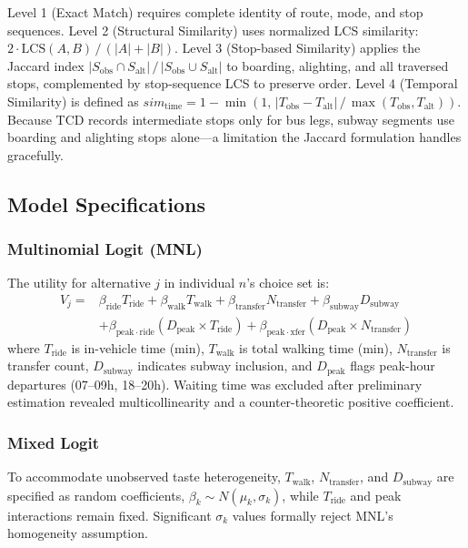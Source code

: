 Level 1 (Exact Match) requires complete identity of route, mode, and stop
sequences. Level 2 (Structural Similarity) uses normalized LCS similarity:
$2\cdot\mathrm{LCS}(A,B)\,/\,(|A|+|B|)$. Level 3 (Stop-based Similarity)
applies the Jaccard index
$|S_{\mathrm{obs}} \cap S_{\mathrm{alt}}|\,/\,|S_{\mathrm{obs}} \cup S_{\mathrm{alt}}|$
to boarding, alighting, and all traversed stops, complemented by stop-sequence
LCS to preserve order. Level 4 (Temporal Similarity) is defined as
$\mathit{sim}_{\mathrm{time}} = 1 - \min(1,\,
|T_{\mathrm{obs}} - T_{\mathrm{alt}}|\,/\,\max(T_{\mathrm{obs}}, T_{\mathrm{alt}}))$.
Because TCD records intermediate stops only for bus legs, subway segments use
boarding and alighting stops alone---a limitation the Jaccard formulation
handles gracefully.

\subsection{Model Specifications}

\subsubsection{Multinomial Logit (MNL)}

The utility for alternative $j$ in individual $n$'s choice set is:
\begin{align*}
V_j ={}& \beta_{\mathrm{ride}} T_{\mathrm{ride}}
 + \beta_{\mathrm{walk}} T_{\mathrm{walk}}
 + \beta_{\mathrm{transfer}} N_{\mathrm{transfer}}
 + \beta_{\mathrm{subway}} D_{\mathrm{subway}} \\
 &+ \beta_{\mathrm{peak \cdot ride}} (D_{\mathrm{peak}} \times T_{\mathrm{ride}})
 + \beta_{\mathrm{peak \cdot xfer}} (D_{\mathrm{peak}} \times N_{\mathrm{transfer}})
\end{align*}
where $T_{\mathrm{ride}}$ is in-vehicle time (min), $T_{\mathrm{walk}}$ is
total walking time (min), $N_{\mathrm{transfer}}$ is transfer count,
$D_{\mathrm{subway}}$ indicates subway inclusion, and $D_{\mathrm{peak}}$
flags peak-hour departures (07--09h, 18--20h). Waiting time was excluded after
preliminary estimation revealed multicollinearity and a counter-theoretic
positive coefficient.

\subsubsection{Mixed Logit}

To accommodate unobserved taste heterogeneity, $T_{\mathrm{walk}}$,
$N_{\mathrm{transfer}}$, and $D_{\mathrm{subway}}$ are specified as random
coefficients, $\beta_k \sim N(\mu_k, \sigma_k)$, while $T_{\mathrm{ride}}$ and
peak interactions remain fixed. Significant $\sigma_k$ values formally reject
MNL's homogeneity assumption.

